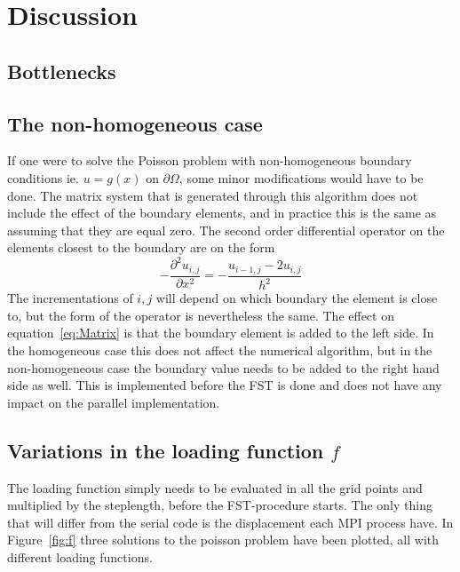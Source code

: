 \section{Discussion}

\subsection{Bottlenecks}

\subsection{The non-homogeneous case}
If one were to solve the Poisson problem with non-homogeneous boundary conditions ie. $u = g(x) $ on $\partial \Omega$, 
some minor modifications would have to be done. 
The matrix system that is generated through this algorithm does not include the effect of the boundary elements, 
and in practice this is the same as assuming that they are equal zero. The second order differential operator on the elements 
closest to the boundary are on the form 
\begin{equation}
	-\frac{\partial^2 u_{i,j}}{\partial x^2} = -\frac{u_{i-1,j}-2u_{i,j}}{h^2}
\end{equation}
The incrementations of $i,j$ will depend on which boundary the element is close to, but the form of the operator is nevertheless the same.
The effect on equation~\ref{eq:Matrix} is that the boundary element is added to the left side.
In the homogeneous case this does not affect the numerical algorithm, but in the non-homogeneous case the boundary value needs to be added to the 
right hand side as well. This is implemented before the FST is done and does not have any impact on the parallel implementation. 

\subsection{Variations in the loading function $f$}
The loading function simply needs to be evaluated in all the grid points and multiplied by the steplength, before the 
FST-procedure starts. The only thing that will differ from the serial code is the displacement each MPI process have.
In Figure~\ref{fig:f} three solutions to the poisson problem have been plotted, all with different loading functions. 

